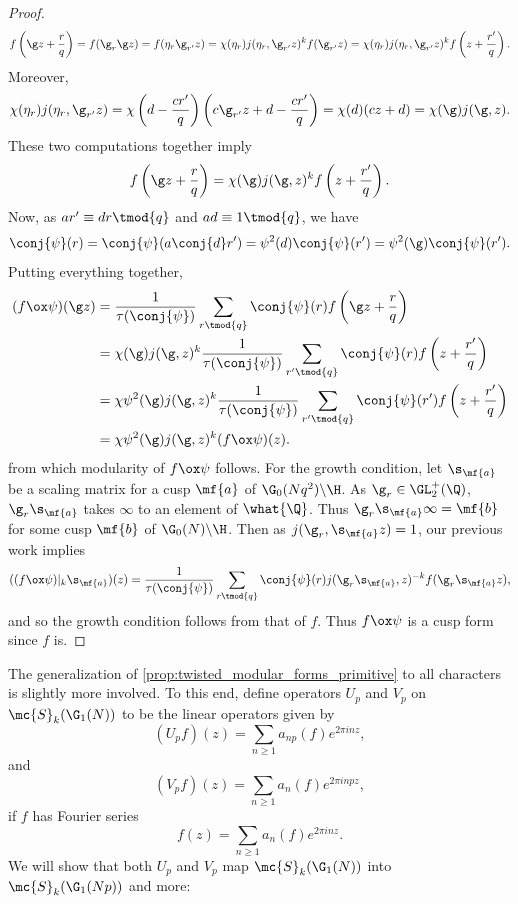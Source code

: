 \documentclass[12pt]{article}
\begin{document}
\begin{proof}
        \[
          f\left(\g z+\frac{r}{q}\right) = f(\g_{r}\g z) = f(\eta_{r}\g_{r'}z) = \chi(\eta_{r})j(\eta_{r},\g_{r'}z)^{k}f(\g_{r'}z) = \chi(\eta_{r})j(\eta_{r},\g_{r'}z)^{k}f\left(z+\frac{r'}{q}\right).
        \]
        Moreover,
        \[
          \chi(\eta_{r})j(\eta_{r},\g_{r'}z) = \chi\left(d-\frac{cr'}{q}\right)\left(c\g_{r'}z+d-\frac{cr'}{q}\right) = \chi(d)(cz+d) = \chi(\g)j(\g,z).
        \]
        These two computations together imply
        \[
          f\left(\g z+\frac{r}{q}\right) = \chi(\g)j(\g,z)^{k}f\left(z+\frac{r'}{q}\right).
        \]
        Now, as \(ar' \equiv dr \tmod{q}\) and \(ad \equiv 1 \tmod{q}\), we have
        \[
          \conj{\psi}(r) = \conj{\psi}(a\conj{d}r') = \psi^{2}(d)\conj{\psi}(r') = \psi^{2}(\g)\conj{\psi}(r').
        \]
        Putting everything together,
        \begin{align*}
          (f \ox \psi)(\g z) &= \frac{1}{\tau(\conj{\psi})}\sum_{r \tmod{q}}\conj{\psi}(r)f\left(\g z+\frac{r}{q}\right) \\
          &= \chi(\g)j(\g,z)^{k}\frac{1}{\tau(\conj{\psi})}\sum_{r' \tmod{q}}\conj{\psi}(r)f\left(z+\frac{r'}{q}\right) \\
          &= \chi\psi^{2}(\g)j(\g,z)^{k}\frac{1}{\tau(\conj{\psi})}\sum_{r' \tmod{q}}\conj{\psi}(r')f\left(z+\frac{r'}{q}\right) \\
          &= \chi\psi^{2}(\g)j(\g,z)^{k}(f \ox \psi)(z).
        \end{align*}
        from which modularity of \(f \ox \psi\) follows. For the growth condition, let \(\s_{\mf{a}}\) be a scaling matrix for a cusp \(\mf{a}\) of \(\G_{0}(Nq^{2})\backslash\H\). As \(\g_{r} \in \GL_{2}^{+}(\Q)\), \(\g_{r}\s_{\mf{a}}\) takes \(\infty\) to an element of \(\what{\Q}\). Thus \(\g_{r}\s_{\mf{a}}\infty = \mf{b}\) for some cusp \(\mf{b}\) of \(\G_{0}(N)\backslash\H\). Then as \(j(\g_{r},\s_{\mf{a}}z) = 1\), our previous work implies
        \[
          ((f \ox \psi)|_{k}\s_{\mf{a}})(z) = \frac{1}{\tau(\conj{\psi})}\sum_{r \tmod{q}}\conj{\psi}(r)j(\g_{r}\s_{\mf{a}},z)^{-k}f(\g_{r}\s_{\mf{a}}z),
        \]
        and so the growth condition follows from that of \(f\). Thus \(f \ox \psi\) is a cusp form since \(f\) is.
      \end{proof}

      The generalization of \cref{prop:twisted_modular_forms_primitive} to all characters is slightly more involved. To this end, define operators \(U_{p}\) and \(V_{p}\) on \(\mc{S}_{k}(\G_{1}(N))\) to be the linear operators given by
      \[
        (U_{p}f)(z) = \sum_{n \ge 1}a_{np}(f)e^{2\pi inz},
      \]
      and
      \[
        (V_{p}f)(z) = \sum_{n \ge 1}a_{n}(f)e^{2\pi inpz},
      \]
      if \(f\) has Fourier series
      \[
        f(z) = \sum_{n \ge 1}a_{n}(f)e^{2\pi inz}.
      \]
      We will show that both \(U_{p}\) and \(V_{p}\) map \(\mc{S}_{k}(\G_{1}(N))\) into \(\mc{S}_{k}(\G_{1}(Np))\) and more:
\end{document}
